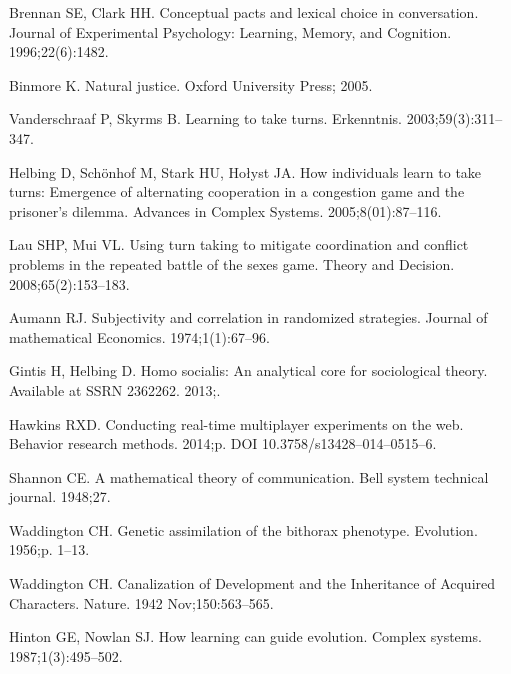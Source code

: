 \documentclass[10pt,letterpaper]{article}
\begin{document}
\begin{thebibliography}{10}
Brennan SE, Clark HH.
\newblock Conceptual pacts and lexical choice in conversation.
\newblock Journal of Experimental Psychology: Learning, Memory, and Cognition.
  1996;22(6):1482.

Binmore K.
\newblock Natural justice.
\newblock Oxford University Press; 2005.

Vanderschraaf P, Skyrms B.
\newblock Learning to take turns.
\newblock Erkenntnis. 2003;59(3):311--347.

Helbing D, Sch{\"o}nhof M, Stark HU, Ho{\l}yst JA.
\newblock How individuals learn to take turns: Emergence of alternating
  cooperation in a congestion game and the prisoner's dilemma.
\newblock Advances in Complex Systems. 2005;8(01):87--116.

Lau SHP, Mui VL.
\newblock Using turn taking to mitigate coordination and conflict problems in
  the repeated battle of the sexes game.
\newblock Theory and Decision. 2008;65(2):153--183.

Aumann RJ.
\newblock Subjectivity and correlation in randomized strategies.
\newblock Journal of mathematical Economics. 1974;1(1):67--96.

Gintis H, Helbing D.
\newblock Homo socialis: An analytical core for sociological theory.
\newblock Available at SSRN 2362262. 2013;.

Hawkins RXD.
\newblock Conducting real-time multiplayer experiments on the web.
\newblock Behavior research methods. 2014;p. DOI 10.3758/s13428--014--0515--6.

Shannon CE.
\newblock A mathematical theory of communication.
\newblock Bell system technical journal. 1948;27.

Waddington CH.
\newblock Genetic assimilation of the bithorax phenotype.
\newblock Evolution. 1956;p. 1--13.

Waddington CH.
\newblock Canalization of Development and the Inheritance of Acquired
  Characters.
\newblock Nature. 1942 Nov;150:563--565.

Hinton GE, Nowlan SJ.
\newblock How learning can guide evolution.
\newblock Complex systems. 1987;1(3):495--502.


\end{thebibliography}
\end{document}
